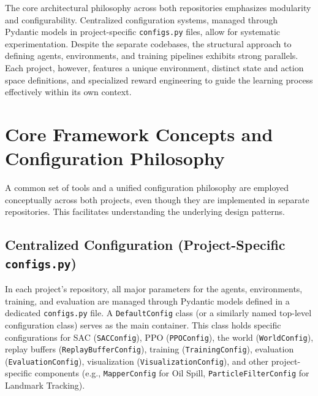\documentclass[11pt,a4paper]{article}
\newcommand{\code}[1]{\texttt{#1}} %
\begin{document}
The core architectural philosophy across both repositories emphasizes modularity and configurability. Centralized configuration systems, managed through Pydantic models in project-specific \code{configs.py} files, allow for systematic experimentation. Despite the separate codebases, the structural approach to defining agents, environments, and training pipelines exhibits strong parallels. Each project, however, features a unique environment, distinct state and action space definitions, and specialized reward engineering to guide the learning process effectively within its own context.

\section{Core Framework Concepts and Configuration Philosophy}
A common set of tools and a unified configuration philosophy are employed conceptually across both projects, even though they are implemented in separate repositories. This facilitates understanding the underlying design patterns.

\subsection{Centralized Configuration (Project-Specific \code{configs.py})}
In each project's repository, all major parameters for the agents, environments, training, and evaluation are managed through Pydantic models defined in a dedicated \code{configs.py} file. A \code{DefaultConfig} class (or a similarly named top-level configuration class) serves as the main container. This class holds specific configurations for SAC (\code{SACConfig}), PPO (\code{PPOConfig}), the world (\code{WorldConfig}), replay buffers (\code{ReplayBufferConfig}), training (\code{TrainingConfig}), evaluation (\code{EvaluationConfig}), visualization (\code{VisualizationConfig}), and other project-specific components (e.g., \code{MapperConfig} for Oil Spill, \code{ParticleFilterConfig} for Landmark Tracking).
\end{document}
